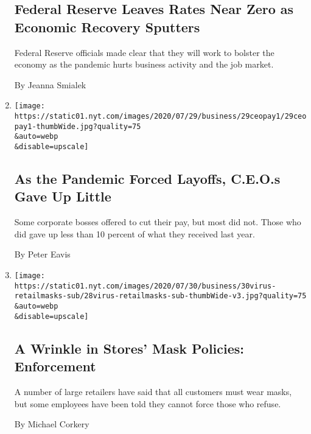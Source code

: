 \begin{enumerate}
  \hypertarget{federal-reserve-leaves-rates-near-zero-as-economic-recovery-sputters}{%
  \subsection{Federal Reserve Leaves Rates Near Zero as Economic
  Recovery
  Sputters}\label{federal-reserve-leaves-rates-near-zero-as-economic-recovery-sputters}}

  Federal Reserve officials made clear that they will work to bolster
  the economy as the pandemic hurts business activity and the job
  market.

  By Jeanna Smialek
\item
  \href{/2020/07/29/business/economy/ceo-pay-pandemic-layoffs.html}{}

  \texttt{[image: https://static01.nyt.com/images/2020/07/29/business/29ceopay1/29ceopay1-thumbWide.jpg?quality=75\\\&auto=webp\\\&disable=upscale]}

  \hypertarget{as-the-pandemic-forced-layoffs-ceos-gave-up-little}{%
  \subsection{As the Pandemic Forced Layoffs, C.E.O.s Gave Up
  Little}\label{as-the-pandemic-forced-layoffs-ceos-gave-up-little}}

  Some corporate bosses offered to cut their pay, but most did not.
  Those who did gave up less than 10 percent of what they received last
  year.

  By Peter Eavis
\item
  \href{/2020/07/29/business/coronavirus-masks-stores-walmart.html}{}

  \texttt{[image: https://static01.nyt.com/images/2020/07/30/business/30virus-retailmasks-sub/28virus-retailmasks-sub-thumbWide-v3.jpg?quality=75\\\&auto=webp\\\&disable=upscale]}

  \hypertarget{a-wrinkle-in-stores-mask-policies-enforcement}{%
  \subsection{A Wrinkle in Stores' Mask Policies:
  Enforcement}\label{a-wrinkle-in-stores-mask-policies-enforcement}}

  A number of large retailers have said that all customers must wear
  masks, but some employees have been told they cannot force those who
  refuse.

  By Michael Corkery
\end{enumerate}

